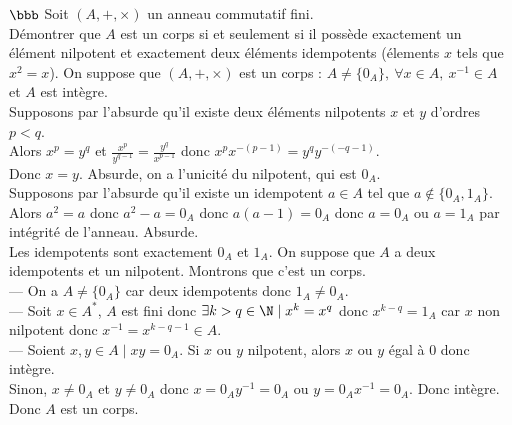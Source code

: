 \documentclass[11pt]{article}
\begin{document}
\begin{exercice}{$\bbb$}{}
    Soit $(A,+,\times)$ un anneau commutatif fini.\\
    Démontrer que $A$ est un corps si et seulement si il possède exactement un élément nilpotent et exactement deux éléments idempotents (élements $x$ tels que $x^2=x$).
    \tcblower
    \boxed{\ra} On suppose que $(A,+,\times)$ est un corps : $A\neq\{0_A\}, ~ \forall x \in A, ~ x^{-1}\in A$ et $A$ est intègre.\\
    Supposons par l'absurde qu'il existe deux éléments nilpotents $x$ et $y$ d'ordres $p<q$.\\
    Alors $x^p=y^q$ et $\frac{x^p}{y^{q-1}}=\frac{y^q}{x^{p-1}}$ donc $x^px^{-(p-1)}=y^qy^{-(-q-1)}$.\\
    Donc $x=y$. Absurde, on a l'unicité du nilpotent, qui est $0_A$.\\
    Supposons par l'absurde qu'il existe un idempotent $a\in A$ tel que $a\notin\{0_A,1_A\}$.\\
    Alors $a^2=a$ donc $a^2-a=0_A$ donc $a(a-1)=0_A$ donc $a=0_A$ ou $a=1_A$ par intégrité de l'anneau. Absurde.\\
    Les idempotents sont exactement $0_A$ et $1_A$.\n
    \boxed{\la} On suppose que $A$ a deux idempotents et un nilpotent. Montrons que c'est un corps.\\
    --- On a $A\neq\{0_A\}$ car deux idempotents donc $1_A\neq0_A$.\\ 
    --- Soit $x\in A^*$, $A$ est fini donc $\exists k>q \in \N \mid x^k=x^q$ donc $x^{k-q}=1_A$ car $x$ non nilpotent donc $x^{-1}=x^{k-q-1}\in A$.\\
    --- Soient $x,y\in A \mid xy=0_A$. Si $x$ ou $y$ nilpotent, alors $x$ ou $y$ égal à 0 donc intègre.\\
    Sinon, $x\neq0_A$ et $y\neq0_A$ donc $x=0_Ay^{-1}=0_A$ ou $y=0_Ax^{-1}=0_A$. Donc intègre.\\
    Donc $A$ est un corps. 
\end{exercice}
\end{document}
